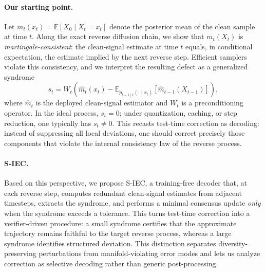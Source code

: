 \documentclass{article}
\theoremstyle{plain}
\theoremstyle{definition}
\theoremstyle{remark}
\newcommand{\SIEC}{\texorpdfstring{S\mbox{-}IEC\xspace}{S-IEC }}
\begin{document}
\paragraph{Our starting point.}
Let \(m_t(x_t) = \mathbb{E}[X_0 \mid X_t = x_t]\) denote the posterior mean of
the clean sample at time \(t\). Along the exact reverse diffusion chain, we
show that \(m_t(X_t)\) is \emph{martingale-consistent}: the clean-signal
estimate at time \(t\) equals, in conditional expectation, the estimate
implied by the next reverse step. Efficient samplers violate this consistency,
and we interpret the resulting defect as a generalized syndrome
\begin{equation}
s_t
=
W_t\!\left(\hat m_t(x_t)
  - \mathbb{E}_{\tilde p_{t-1\mid t}(\cdot \mid x_t)}[\hat m_{t-1}(X_{t-1})]\right),
\label{eq:intro_syndrome}
\end{equation}
where \(\hat m_t\) is the deployed clean-signal estimator and \(W_t\) is a
preconditioning operator. In the ideal process, \(s_t = 0\); under
quantization, caching, or step reduction, one typically has \(s_t \neq 0\).
This recasts test-time correction as decoding: instead of suppressing all
local deviations, one should correct precisely those components that violate
the internal consistency law of the reverse process.

\paragraph{\SIEC.}
Based on this perspective, we propose \SIEC, a training-free
decoder that, at each reverse step, computes redundant clean-signal estimates
from adjacent timesteps, extracts the syndrome, and performs a minimal
consensus update \emph{only} when the syndrome exceeds a tolerance. This
turns test-time correction into a verifier-driven procedure: a small syndrome
certifies that the approximate trajectory remains faithful to the target
reverse process, whereas a large syndrome identifies structured deviation.
This distinction separates diversity-preserving perturbations from
manifold-violating error modes and lets us analyze correction as selective
decoding rather than generic post-processing.
\end{document}
